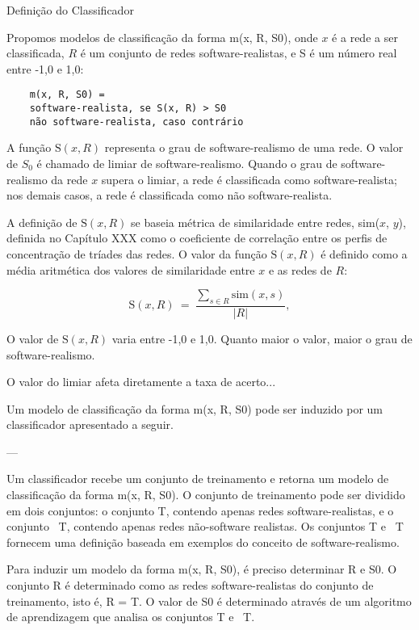 \begin{section}{Definição do Classificador}
	
	Propomos modelos de classificação da forma m(x, R, S0), onde $x$ é a rede a ser classificada, $R$ é um conjunto de redes software-realistas, e S é um número real entre -1,0 e 1,0:
	
\begin{verbatim}
	m(x, R, S0) =
	software-realista, se S(x, R) > S0
	não software-realista, caso contrário
\end{verbatim}
	
	A função $\mathrm{S}(x, R)$ representa o grau de software-realismo de uma rede. O valor de $S_0$ é chamado de limiar de software-realismo. Quando o grau de software-realismo da rede $x$ supera o limiar, a rede é classificada como software-realista; nos demais casos, a rede é classificada como não software-realista.
	
	A definição de $\mathrm{S}(x, R)$ se baseia métrica de similaridade entre redes, sim($x$, $y$), definida no Capítulo XXX como o coeficiente de correlação entre os perfis de concentração de tríades das redes. O valor da função $\mathrm{S}(x, R)$ é definido como a média aritmética dos valores de similaridade entre $x$ e as redes de $R$:

	$$
	\mathrm{S}(x, R) ~=~ \frac{
	\displaystyle\sum_{s \in R} \mathrm{sim}(x, s)
	}{|R|} \mathrm{,}
	$$

	O valor de $\mathrm{S}(x, R)$ varia entre -1,0 e 1,0. Quanto maior o valor, maior o grau de software-realismo.
	
	O valor do limiar afeta diretamente a taxa de acerto...

	Um modelo de classificação da forma m(x, R, S0) pode ser induzido por um classificador apresentado a seguir.

	---

	Um classificador recebe um conjunto de treinamento e retorna um modelo de classificação da forma m(x, R, S0). O conjunto de treinamento pode ser dividido em dois conjuntos: o conjunto T, contendo apenas redes software-realistas, e o conjunto ~T, contendo apenas redes não-software realistas. Os conjuntos T e ~T fornecem uma definição baseada em exemplos do conceito de software-realismo.
	
	Para induzir um modelo da forma m(x, R, S0), é preciso determinar R e S0. O conjunto R é determinado como as redes software-realistas do conjunto de treinamento, isto é, R = T. O valor de S0 é determinado através de um algoritmo de aprendizagem que analisa os conjuntos T e ~T.
	

\end{section}
